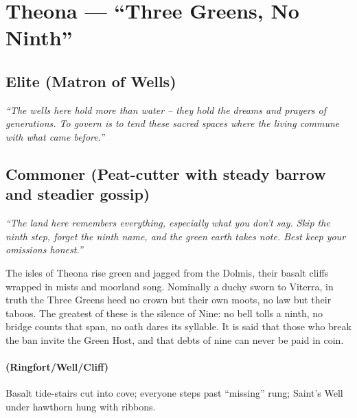 \section{Theona --- ``Three Greens, No Ninth''}
\label{chap:theona}

\subsection*{Elite (Matron of Wells)}
\textit{``The wells here hold more than water – they hold the dreams and prayers of generations. To govern is to tend these sacred spaces where the living commune with what came before.''}

\subsection*{Commoner (Peat-cutter with steady barrow and steadier gossip)}
\textit{``The land here remembers everything, especially what you don't say. Skip the ninth step, forget the ninth name, and the green earth takes note. Best keep your omissions honest.''}

\begin{tcolorbox}[colback=black!3,colframe=black!40!white,title={Theme \& Atmosphere}]
The isles of Theona rise green and jagged from the Dolmis, their basalt cliffs wrapped in mists and moorland song. Nominally a duchy sworn to Viterra, in truth the Three Greens heed no crown but their own moots, no law but their taboos. The greatest of these is the silence of Nine: no bell tolls a ninth, no bridge counts that span, no oath dares its syllable. It is said that those who break the ban invite the Green Host, and that debts of nine can never be paid in coin.
\end{tcolorbox}

\paragraph*{(Ringfort/Well/Cliff)} Basalt tide-stairs cut into cove; everyone steps past ``missing'' rung; Saint's Well under hawthorn hung with ribbons.

